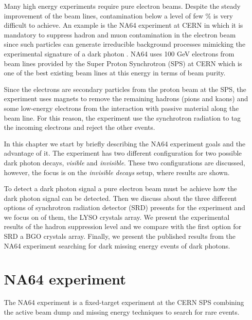 
Many high energy experiments require pure electron beams. Despite the steady improvement of the beam lines,
contamination below a level of few \% is very difficult to achieve. An example is the NA64 experiment\cite{na64} at CERN
in which it is mandatory to suppress hadron and muon contamination in the electron beam since such particles can
generate irreducible background processes mimicking the experimental signature of a dark photon \cite{prlpaper, proposal}.
NA64 uses 100 GeV electrons from beam lines provided by the Super Proton Synchrotron (SPS) at CERN which is one of the
best existing beam lines at this energy in terms of beam purity\cite{sps}.\par

Since the electrons are secondary particles from the proton beam at the SPS, the experiment uses magnets to remove the
remaining hadrons (pions and kaons) and some low-energy electrons from the interaction with passive material along the
beam line. For this reason, the experiment use the synchrotron radiation to tag the incoming electrons and reject the
other events.\par

In this chapter we start by briefly describing the NA64 experiment goals and the advantage of it. The experiment has two
different configuration for two possible dark photon decays, {\it visible} and {\it invisible}. These two configurations are
discussed, however, the focus is on the {\it invisible decays} setup, where results are shown.\par

To detect a dark photon signal a pure electron beam must be achieve how the dark photon signal can be detected. Then we
discuss about the three different options of synchrotron radiation detector (SRD) presents for the experiment and we
focus on of them, the LYSO crystals array. We present the experimental results of the hadron suppression level and we
compare with the first option for SRD a BGO crystals array. Finally, we present the published results from the NA64
experiment searching for dark missing energy events of dark photons.\par


\section{NA64 experiment}

The NA64 experiment is a fixed-target experiment at the CERN SPS combining the active beam dump and missing energy
techniques to search for rare events.\par

